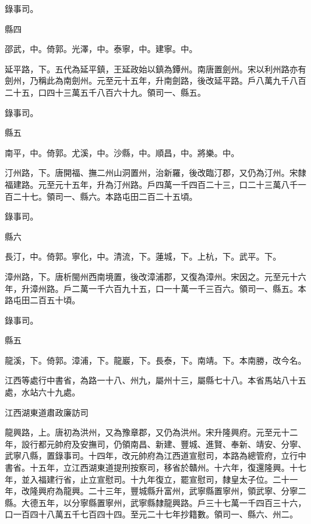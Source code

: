 \begin{pinyinscope}
 錄事司。



 縣四



 邵武，中。倚郭。光澤，中。泰寧，中。建寧。中。



 延平路，下。五代為延平鎮，王延政始以鎮為鐔州。南唐置劍州。宋以利州路亦有劍州，乃稱此為南劍州。元至元十五年，升南劍路，後改延平路。戶八萬九千八百二十五，口四十三萬五千八百六十九。領司一、縣五。



 錄事司。



 縣五



 南平，中。倚郭。尤溪，中。沙縣，中。順昌，中。將樂。中。



 汀州路，下。唐開福、撫二州山洞置州，治新羅，後改臨汀郡，又仍為汀州。宋隸福建路。元至元十五年，升為汀州路。戶四萬一千四百二十三，口二十三萬八千一百二十七。領司一、縣六。本路屯田二百二十五頃。



 錄事司。



 縣六



 長汀，中。倚郭。寧化，中。清流，下。蓮城，下。上杭，下。武平。下。



 漳州路，下。唐析閩州西南境置，後改漳浦郡，又復為漳州。宋因之。元至元十六年，升漳州路。戶二萬一千六百九十五，口一十萬一千三百六。領司一、縣五。本路屯田二百五十頃。



 錄事司。



 縣五



 龍溪，下。倚郭。漳浦，下。龍巖，下。長泰，下。南靖。下。本南勝，改今名。



 江西等處行中書省，為路一十八、州九，屬州十三，屬縣七十八。本省馬站八十五處，水站六十九處。



 江西湖東道肅政廉訪司



 龍興路，上。唐初為洪州，又為豫章郡，又仍為洪州。宋升隆興府。元至元十二年，設行都元帥府及安撫司，仍領南昌、新建、豐城、進賢、奉新、靖安、分寧、武寧八縣，置錄事司。十四年，改元帥府為江西道宣慰司，本路為總管府，立行中書省。十五年，立江西湖東道提刑按察司，移省於贛州。十六年，復還隆興。十七年，並入福建行省，止立宣慰司。十九年復立，罷宣慰司，隸皇太子位。二十一年，改隆興府為龍興。二十三年，豐城縣升富州，武寧縣置寧州，領武寧、分寧二縣。大德五年，以分寧縣置寧州，武寧縣隸龍興路。戶三十七萬一千四百三十六，口一百四十八萬五千七百四十四。至元二十七年抄籍數。領司一、縣六、州二。




\end{pinyinscope}
